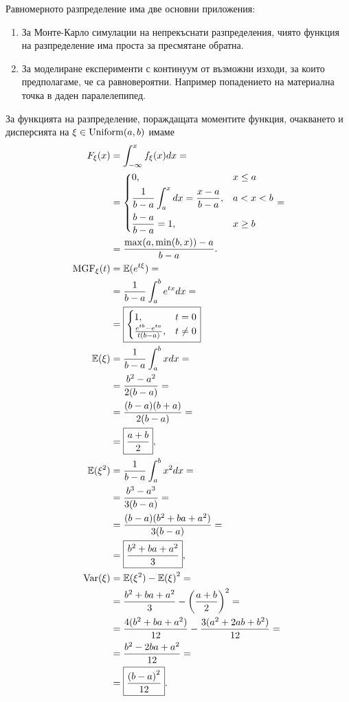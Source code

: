 \documentclass[numbers=endperiod, bibliography=totocnumbered]{scrartcl}
\begin{document}
Равномерното разпределение има две основни приложения:
\begin{enumerate}
  \item За Монте-Карло симулации на непрекъснати разпределения, чиято функция на разпределение има проста за пресмятане обратна.
  \item За моделиране експерименти с континуум от възможни изходи, за които предполагаме, че са равновероятни. Например попадението на материална точка в даден паралелепипед.
\end{enumerate}

За функцията на разпределение, пораждащата моментите функция, очакването и дисперсията на \( \xi \in \operatorname{Uniform}(a, b) \) имаме
\begingroup
\allowdisplaybreaks
\begin{align*}
  F_\xi(x)
  &=
  \int_{-\infty}^x f_\xi(x) dx
  = \\ &=
  \begin{dcases}
    0, &x \leq a \\
    \frac 1 {b-a} \int_a^x dx = \frac {x-a} {b-a}, &a < x < b \\
    \frac {b-a} {b-a} = 1, &x \geq b
  \end{dcases}
  = \\ &=
  \frac {\max(a, \min(b, x))-a} {b-a}.
  \\
  \operatorname{MGF}_\xi(t)
  &=
  \mathbb{E}(e^{t\xi})
  = \\ &=
  \frac 1 {b-a} \int_a^b e^{tx} dx
  = \\ &=
  \boxed{\begin{cases}
    1, &t = 0 \\
    \frac {e^{tb} - e^{ta}} {t(b-a)}, &t \neq 0
  \end{cases}}
  \\
  \mathbb{E}(\xi)
  &=
  \frac 1 {b-a} \int_a^b x dx
  = \\ &=
  \frac {b^2 - a^2} {2(b-a)}
  = \\ &=
  \frac {(b-a)(b+a)} {2(b-a)}
  = \\ &=
  \boxed{\frac {a + b} 2},
  \\
  \mathbb{E}(\xi^2)
  &=
  \frac 1 {b-a} \int_a^b x^2 dx
  = \\ &=
  \frac {b^3 - a^3} {3(b-a)}
  = \\ &=
  \frac {(b-a)(b^2+ba+a^2)} {3(b-a)}
  = \\ &=
  \boxed{\frac {b^2+ba+a^2} 3},
  \\
  \operatorname{Var}(\xi)
  &=
  \mathbb{E}(\xi^2) - {\mathbb{E}(\xi)}^2
  = \\ &=
  \frac {b^2+ba+a^2} 3 - {\left(\frac {a+b} 2 \right)}^2
  = \\ &=
  \frac {4(b^2+ba+a^2)} {12} - \frac {3 (a^2+2ab+b^2)} {12}
  = \\ &=
  \frac {b^2-2ba+a^2} {12}
  = \\ &=
  \boxed{\frac {{(b-a)}^2} {12}}.
\end{align*}
\endgroup
\end{document}
